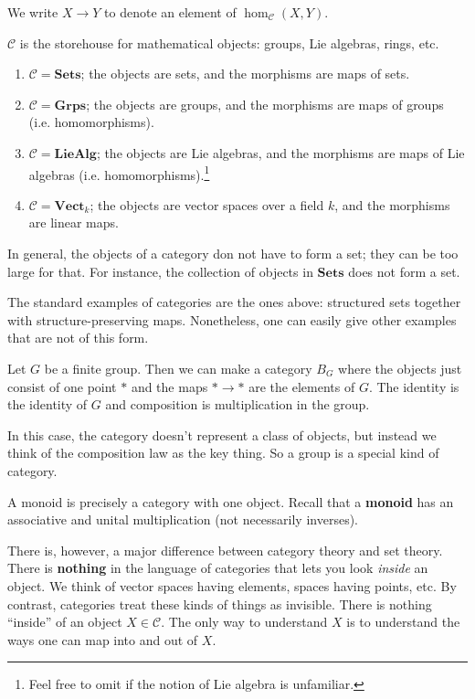 We write $X \to Y$ to denote an element of $\hom_{\mathcal{C}}(X, Y)$.

$\mathcal{C}$ is the storehouse for mathematical objects: groups, Lie algebras,
rings, etc.
\begin{example} 
\begin{enumerate}
\item $\mathcal{C}  = \mathbf{Sets}$; the objects are sets, and the morphisms
are maps of sets. 
\item $\mathcal{C} = \mathbf{Grps}$; the objects are groups, and the morphisms
are maps of groups (i.e. homomorphisms).
\item $\mathcal{C} = \mathbf{LieAlg}$; the objects are Lie algebras, and the
morphisms are maps of Lie algebras (i.e. homomorphisms).\footnote{Feel free to
omit if the notion of Lie algebra is unfamiliar.}
\item  $\mathcal{C} = \mathbf{Vect}_k$; the objects are vector spaces over a
field $k$, and the morphisms are linear maps. 
\end{enumerate}
\end{example} 



In general, the objects of a category don not have to form a set; they can be too large for
that.
For instance, the collection of objects in $\mathbf{Sets}$ does not form a set. 

The standard examples of categories are the ones above: structured sets
together with structure-preserving maps. Nonetheless, one can easily give
other examples that are not of this form.

\begin{example} 
Let $G$ be a finite group. Then we can make a category $B_G$ where the objects
just consist of one point $\ast$ and the maps $\ast \to \ast$ are the elements
of $G$. The identity is the identity of $G$ and composition is multiplication
in the group. 

In this case, the category doesn't represent  a class of objects, but
instead we think of the composition law as the key thing. So a group is a
special kind of category.
\end{example} 

\begin{example} 
A monoid is precisely a category with one object. Recall that a \textbf{monoid}
has an associative and unital multiplication (not necessarily inverses).
\end{example} 

There is, however, a major difference between category theory and set theory.
There is \textbf{nothing} in the language of categories that lets you look
\emph{inside} an object. We think of vector spaces having elements, spaces
having points, etc. 
By contrast, categories treat these kinds of things as invisible. There
is nothing ``inside'' of an object $X \in \mathcal{C}$. The only way to understand $X$ is
to understand the ways one can map into and out of $X$. 

